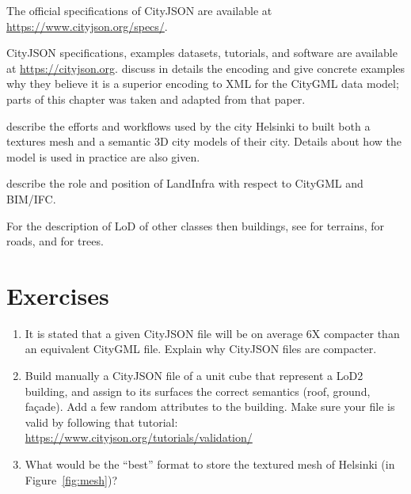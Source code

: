 The official specifications of CityJSON are available at \url{https://www.cityjson.org/specs/}.

CityJSON specifications, examples datasets, tutorials, and software are available at \url{https://cityjson.org}.
\citet{Ledoux19} discuss in details the encoding and give concrete examples why they believe it is a superior encoding to XML for the CityGML data model; parts of this chapter was taken and adapted from that paper.

\citet{Helsinki19} describe the efforts and workflows used by the city Helsinki to built both a textures mesh and a semantic 3D city models of their city. 
Details about how the model is used in practice are also given.

\citet{Kumar19} describe the role and position of LandInfra with respect to CityGML and BIM/IFC\@.

For the description of LoD of other classes then buildings, see \citet{Kumar19} for terrains, \citet{Labetski18} for roads, and \citet{Ortega18} for trees.

%
\section{Exercises}

\begin{enumerate}
  \item It is stated that a given CityJSON file will be on average 6X compacter than an equivalent CityGML file. Explain why CityJSON files are compacter.
  \item Build manually a CityJSON file of a unit cube that represent a LoD2 building, and assign to its surfaces the correct semantics (roof, ground, façade). Add a few random attributes to the building. Make sure your file is valid by following that tutorial: \url{https://www.cityjson.org/tutorials/validation/}
  \item What would be the ``best'' format to store the textured mesh of Helsinki (in Figure~\ref{fig:mesh})?
\end{enumerate}
